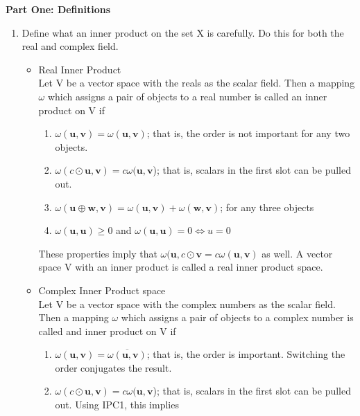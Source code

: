 \documentclass[11pt]{SelfArxOneColBMN}
\affiliation{\textsuperscript{1}\textit{John E. Walker Department of Economics,
Clemson University,Clemson, SC: email ijdavis@g.clemson.edu}}
\date{\small{Version ~\today}}
\begin{document}
\flushbottom

\maketitle

\renewcommand{\theexercise}{\arabic{exercise}}%

\textbf{Part One: Definitions}
\begin{enumerate}
  \item Define what an inner product on the set X is carefully. Do this for both the real and complex field.
  \begin{solution}
    \begin{itemize}
      \item Real Inner Product\\
      Let V be a vector space with the reals as the scalar field. Then a mapping $\omega$ which assigns a pair of objects to a real number is called an inner product on V if
      \begin{enumerate}
        \item $\omega(\mathbf{u,v}) = \omega(\mathbf{u,v})$; that is, the order is not important for any two objects.
        \item $\omega(c\odot\mathbf{u,v}) = c\omega(\mathbf{u,v}$); that is, scalars in the first slot can be pulled out.
        \item $\omega(\mathbf{u} \oplus \mathbf{w,v}) = \omega(\mathbf{u,v}) + \omega(\mathbf{w,v})$; for any three objects
        \item $\omega(\mathbf{u,u}) \geq 0$ and $\omega(\mathbf{u,u}) = 0 \iff u = 0$
      \end{enumerate}
      These properties imply that $\omega(\mathbf{u},c\odot\mathbf{v} = c\omega(\mathbf{u,v})$ as well. A vector space V with an inner product is called a real inner product space.
      \item Complex Inner Product space\\
      Let V be a vector space with the complex numbers as the scalar field. Then a mapping $\omega$ which assigns a pair of objects to a complex number is called and inner product on V if
      \begin{enumerate}
        \item $\omega(\mathbf{u,v}) = \overline{\omega(\mathbf{u,v})}$; that is, the order is important. Switching the order conjugates the result.
        \item $\omega(c\odot\mathbf{u,v}) = c\omega(\mathbf{u,v}$); that is, scalars in the first slot can be pulled out. Using IPC1, this implies

\end{enumerate}
\end{itemize}
\end{solution}
\end{enumerate}
\end{document}

